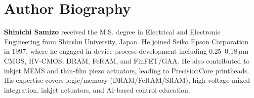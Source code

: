 \documentclass[journal]{IEEEtran}
\begin{document}
\section*{Author Biography}
\textbf{Shinichi Samizo} received the M.S. degree in Electrical and Electronic Engineering from Shinshu University, Japan. He joined Seiko Epson Corporation in 1997, where he engaged in device process development including 0.25--0.18\,$\mu$m CMOS, HV-CMOS, DRAM, FeRAM, and FinFET/GAA. He also contributed to inkjet MEMS and thin-film piezo actuators, leading to PrecisionCore printheads. His expertise covers logic/memory (DRAM/FeRAM/SRAM), high-voltage mixed integration, inkjet actuators, and AI-based control education.
\end{document}
